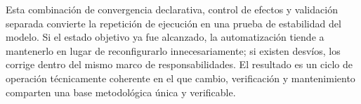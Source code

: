 Esta combinación de convergencia declarativa, control de efectos y validación separada convierte la repetición de ejecución en una prueba de estabilidad del modelo. Si el estado objetivo ya fue alcanzado, la automatización tiende a mantenerlo en lugar de reconfigurarlo innecesariamente; si existen desvíos, los corrige dentro del mismo marco de responsabilidades. El resultado es un ciclo de operación técnicamente coherente en el que cambio, verificación y mantenimiento comparten una base metodológica única y verificable.
